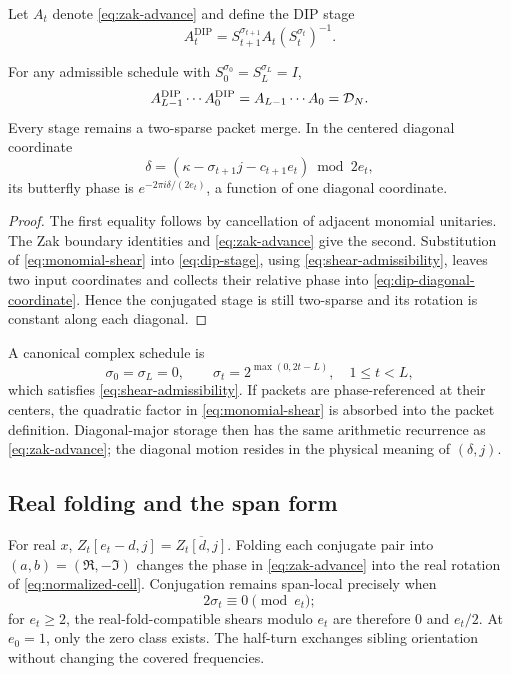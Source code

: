 Let $A_t$ denote \eqref{eq:zak-advance} and define the DIP stage
\begin{equation}
 A_t^{\mathrm{DIP}}=S_{t+1}^{\sigma_{t+1}}A_t
 (S_t^{\sigma_t})^{-1}.
 \label{eq:dip-stage}
\end{equation}

\begin{theorem}
For any admissible schedule with $S_0^{\sigma_0}=S_L^{\sigma_L}=I$,
\begin{equation}
 A_{L-1}^{\mathrm{DIP}}\cdots A_0^{\mathrm{DIP}}
 =A_{L-1}\cdots A_0=\mathcal{D}_N.
 \label{eq:dip-exactness}
\end{equation}
Every stage remains a two-sparse packet merge.  In the centered diagonal
coordinate
\begin{equation}
 \delta=(\kappa-\sigma_{t+1}j-c_{t+1}e_t)\bmod 2e_t,
 \label{eq:dip-diagonal-coordinate}
\end{equation}
its butterfly phase is $e^{-2\pi i\delta/(2e_t)}$, a function of one diagonal
coordinate.
\end{theorem}
\begin{proof}
The first equality follows by cancellation of adjacent monomial unitaries.
The Zak boundary identities and \eqref{eq:zak-advance} give the second.
Substitution of \eqref{eq:monomial-shear} into \eqref{eq:dip-stage}, using
\eqref{eq:shear-admissibility}, leaves two input coordinates and collects their
relative phase into \eqref{eq:dip-diagonal-coordinate}.  Hence the conjugated
stage is still two-sparse and its rotation is constant along each diagonal.
\end{proof}

A canonical complex schedule is
\begin{equation}
 \sigma_0=\sigma_L=0,
 \qquad
 \sigma_t=2^{\max(0,2t-L)},\quad1\le t<L,
 \label{eq:canonical-dip-schedule}
\end{equation}
which satisfies \eqref{eq:shear-admissibility}.  If packets are phase-referenced
at their centers, the quadratic factor in \eqref{eq:monomial-shear} is absorbed
into the packet definition.  Diagonal-major storage then has the same arithmetic
recurrence as \eqref{eq:zak-advance}; the diagonal motion resides in the
physical meaning of $(\delta,j)$.

\subsection{Real folding and the span form}

For real $x$, $Z_t[e_t-d,j]=\overline{Z_t[d,j]}$.  Folding each conjugate pair
into $(a,b)=(\Re,-\Im)$ changes the phase in \eqref{eq:zak-advance} into the
real rotation of \eqref{eq:normalized-cell}.  Conjugation remains span-local
precisely when
\begin{equation}
 2\sigma_t\equiv0\pmod{e_t};
 \label{eq:real-shear-law}
\end{equation}
for $e_t\ge2$, the real-fold-compatible shears modulo $e_t$ are therefore $0$
and $e_t/2$.  At $e_0=1$, only the zero class exists.
The half-turn exchanges sibling orientation without changing the covered
frequencies.

